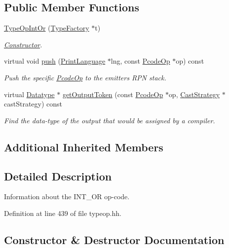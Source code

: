\subsection*{Public Member Functions}
\begin{DoxyCompactItemize}
\item 
\mbox{\hyperlink{class_type_op_int_or_a4f7faf44b3284c33933c8ae5f2820f3a}{Type\+Op\+Int\+Or}} (\mbox{\hyperlink{class_type_factory}{Type\+Factory}} $\ast$t)
\begin{DoxyCompactList}\small\item\em \mbox{\hyperlink{class_constructor}{Constructor}}. \end{DoxyCompactList}\item 
virtual void \mbox{\hyperlink{class_type_op_int_or_ade4437d6b019dad4cddbf857453e4c5b}{push}} (\mbox{\hyperlink{class_print_language}{Print\+Language}} $\ast$lng, const \mbox{\hyperlink{class_pcode_op}{Pcode\+Op}} $\ast$op) const
\begin{DoxyCompactList}\small\item\em Push the specific \mbox{\hyperlink{class_pcode_op}{Pcode\+Op}} to the emitter\textquotesingle{}s R\+PN stack. \end{DoxyCompactList}\item 
virtual \mbox{\hyperlink{class_datatype}{Datatype}} $\ast$ \mbox{\hyperlink{class_type_op_int_or_a73a740a728241ee2e922b29134c49cd4}{get\+Output\+Token}} (const \mbox{\hyperlink{class_pcode_op}{Pcode\+Op}} $\ast$op, \mbox{\hyperlink{class_cast_strategy}{Cast\+Strategy}} $\ast$cast\+Strategy) const
\begin{DoxyCompactList}\small\item\em Find the data-\/type of the output that would be assigned by a compiler. \end{DoxyCompactList}\end{DoxyCompactItemize}
\subsection*{Additional Inherited Members}


\subsection{Detailed Description}
Information about the I\+N\+T\+\_\+\+OR op-\/code. 

Definition at line 439 of file typeop.\+hh.



\subsection{Constructor \& Destructor Documentation}
\mbox{\label{class_type_op_int_or_a4f7faf44b3284c33933c8ae5f2820f3a}} 
